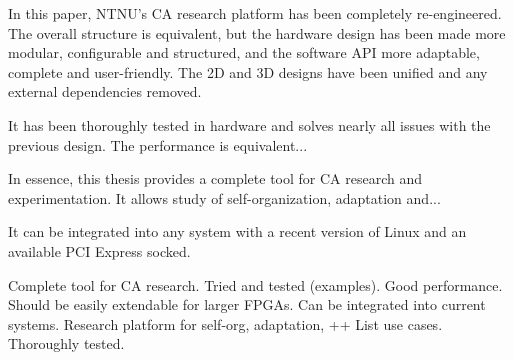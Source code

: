 In this paper, NTNU's CA research platform has been completely re-engineered.
The overall structure is equivalent, but the hardware design has been made more modular, configurable and structured, and the software API more adaptable, complete and user-friendly.
The 2D and 3D designs have been unified and any external dependencies removed.

It has been thoroughly tested in hardware and solves nearly all issues with the previous design.
The performance is equivalent... \TODO

In essence, this thesis provides a complete tool for CA research and experimentation.
It allows study of self-organization, adaptation and... \TODO

It can be integrated into any system with a recent version of Linux and an available PCI Express socked.

Complete tool for CA research.
Tried and tested (examples).
Good performance.
Should be easily extendable for larger FPGAs.
Can be integrated into current systems.
Research platform for self-org, adaptation, ++
List use cases.
Thoroughly tested.
